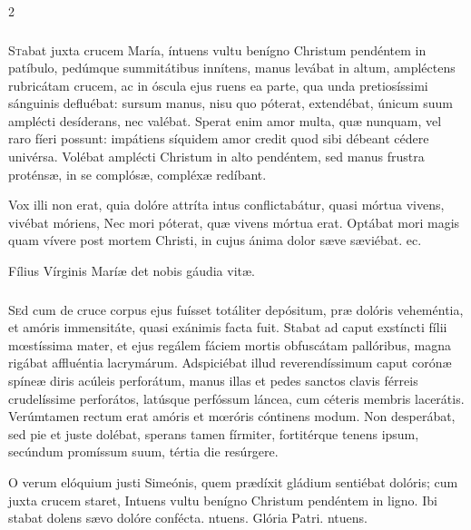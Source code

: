 \documentclass[9pt,twoside]{extarticle}
\begin{document}
\begin{multicols}{2}
\subsubsection*{\center {}}
\lettrine{S}tabat juxta crucem María, íntuens vultu benígno Christum pendéntem in patíbulo, pedúmque summitátibus innítens, manus levábat in altum, ampléctens rubricátam crucem, ac in óscula ejus ruens ea parte, qua unda pretiosíssimi sánguinis defluébat: sursum manus, nisu quo póterat, extendébat, únicum suum amplécti desíderans, nec valébat. Sperat enim amor multa, quæ nunquam, vel raro fíeri possunt: impátiens síquidem amor credit quod sibi débeant cédere univérsa. Volébat amplécti Christum in alto pendéntem, sed manus frustra proténsæ, in se complósæ, compléxæ redíbant.

\begin{tightlist}{}
\item {} Vox illi non erat, quia dolóre attríta intus conflictabátur, quasi mórtua vivens, vivébat móriens, \textred{*} Nec mori póterat, quæ vivens mórtua erat.  Optábat mori magis quam vívere post mortem Christi, in cujus ánima dolor sæve sæviébat. ec.
\item {\small {} Fílius Vírginis Maríæ det nobis gáudia vitæ.}
\end{tightlist}

\subsubsection*{\center {}}
\lettrine{S}ed cum de cruce corpus ejus fuísset totáliter depósitum, præ dolóris veheméntia, et amóris immensitáte, quasi exánimis facta fuit. Stabat ad caput exstíncti fílii mœstíssima mater, et ejus regálem fáciem mortis obfuscátam pallóribus, magna rigábat affluéntia lacrymárum. Adspiciébat illud reverendíssimum caput corónæ spíneæ diris acúleis perforátum, manus illas et pedes sanctos clavis férreis crudelíssime perforátos, latúsque perfóssum láncea, cum céteris membris lacerátis. Verúmtamen rectum erat amóris et mœróris cóntinens modum. Non desperábat, sed pie et juste dolébat, sperans tamen fírmiter, fortitérque tenens ipsum, secúndum promíssum suum, tértia die resúrgere.

\begin{tightlist}{}
\item {} O verum elóquium justi Simeónis, quem prædíxit gládium sentiébat dolóris; cum juxta crucem staret, \textred{*} Intuens vultu benígno Christum pendéntem in ligno.  Ibi stabat dolens sævo dolóre confécta. ntuens. Glória Patri. ntuens.
\end{tightlist}


\end{multicols}
\end{document}

